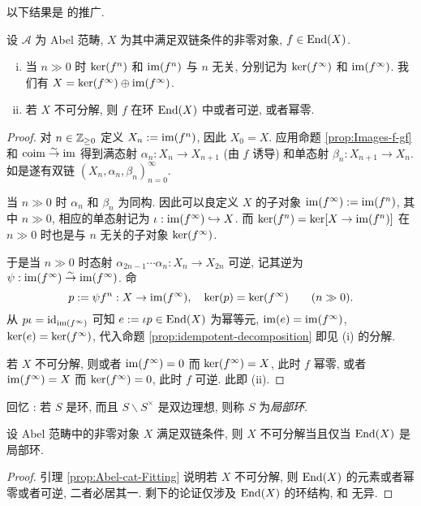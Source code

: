 以下结果是 \cite[引理 6.11.5]{Li1} 的推广.
\begin{lemma}\label{prop:Abel-cat-Fitting}
	设 $\mathcal{A}$ 为 Abel 范畴, $X$ 为其中满足双链条件的非零对象, $f \in \operatorname{End}(X)$.
	\begin{enumerate}[(i)]
		\item 当 $n \gg 0$ 时 $\operatorname{ker}(f^n)$ 和 $\operatorname{im}(f^n)$ 与 $n$ 无关, 分别记为 $\operatorname{ker}(f^\infty)$ 和 $\operatorname{im}(f^\infty)$. 我们有 $X = \operatorname{ker}(f^\infty) \oplus \operatorname{im}(f^\infty)$.
		\item 若 $X$ 不可分解, 则 $f$ 在环 $\operatorname{End}(X)$ 中或者可逆, 或者幂零.
	\end{enumerate}
\end{lemma}
\begin{proof}
	对 $n \in \mathbb{Z}_{\geq 0}$ 定义 $X_n := \operatorname{im}(f^n)$, 因此 $X_0 = X$. 应用命题 \ref{prop:Images-f-gf} 和 $\operatorname{coim} \stackrel{\sim}{\rightarrow} \operatorname{im}$ 得到满态射 $\alpha_n: X_n \to X_{n+1}$ (由 $f$ 诱导) 和单态射 $\beta_n: X_{n+1} \to X_n$.	如是遂有双链 $(X_n, \alpha_n, \beta_n)_{n=0}^\infty$.

	当 $n \gg 0$ 时 $\alpha_n$ 和 $\beta_n$ 为同构. 因此可以良定义 $X$ 的子对象 $\operatorname{im}(f^\infty) := \operatorname{im}(f^n)$, 其中 $n \gg 0$, 相应的单态射记为 $\iota: \operatorname{im}(f^\infty) \hookrightarrow X$. 而 $\operatorname{ker}(f^n) = \operatorname{ker}[X \to \operatorname{im}(f^n)]$ 在 $n \gg 0$ 时也是与 $n$ 无关的子对象 $\operatorname{ker}(f^\infty)$.

	于是当 $n \gg 0$ 时态射 $\alpha_{2n-1} \cdots \alpha_n: X_n \to X_{2n}$ 可逆, 记其逆为 $\psi: \operatorname{im}(f^\infty) \stackrel{\sim}{\rightarrow} \operatorname{im}(f^\infty)$. 命
	\[ p := \psi f^n: X \to \operatorname{im}(f^\infty), \quad \operatorname{ker}(p) = \operatorname{ker}(f^\infty) \qquad (n \gg 0). \]
	从 $p \iota = \mathrm{id}_{\operatorname{im}(f^\infty)}$ 可知 $e := \iota p \in \operatorname{End}(X)$ 为幂等元, $\operatorname{im}(e) = \operatorname{im}(f^\infty)$, $\operatorname{ker}(e) = \operatorname{ker}(f^\infty)$, 代入命题 \ref{prop:idempotent-decomposition} 即见 (i) 的分解.
	
	若 $X$ 不可分解, 则或者 $\operatorname{im}(f^\infty) = 0$ 而 $\operatorname{ker}(f^\infty) = X$, 此时 $f$ 幂零, 或者 $\operatorname{im}(f^\infty) = X$ 而 $\operatorname{ker}(f^\infty) = 0$, 此时 $f$ 可逆. 此即 (ii).
\end{proof}

回忆 \cite[定义 6.12.3]{Li1}: 若 $S$ 是环, 而且 $S \smallsetminus S^\times$ 是双边理想, 则称 $S$ 为\emph{局部环}.

\begin{corollary}\label{prop:indecomposable-local-ring}
	设 Abel 范畴中的非零对象 $X$ 满足双链条件, 则 $X$ 不可分解当且仅当 $\operatorname{End}(X)$ 是局部环.
\end{corollary}
\begin{proof}
	引理 \ref{prop:Abel-cat-Fitting} 说明若 $X$ 不可分解, 则 $\operatorname{End}(X)$ 的元素或者幂零或者可逆, 二者必居其一. 剩下的论证仅涉及 $\operatorname{End}(X)$ 的环结构, 和 \cite[引理 6.12.6]{Li1} 无异.
\end{proof}

